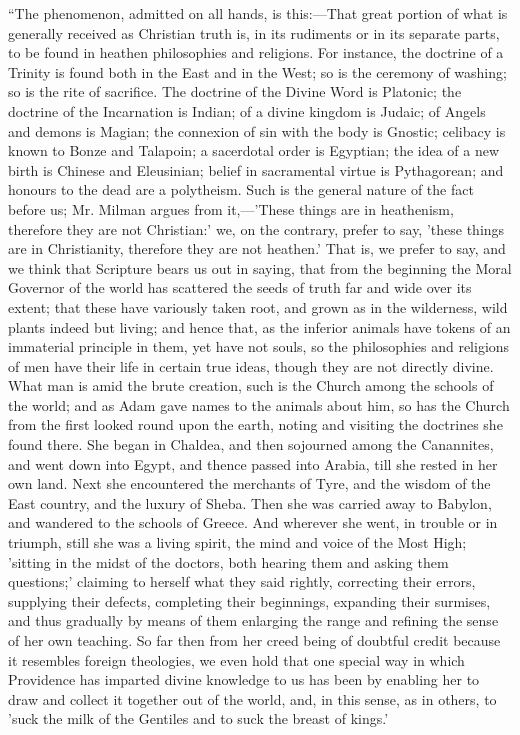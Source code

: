 ``The phenomenon, admitted on all hands, is
this:—That great portion of what is generally
received as Christian truth is, in its rudiments or in
its separate parts, to be found in heathen philosophies
and religions. For instance, the doctrine of a Trinity is
found both in the East and in the West; so is the
ceremony of washing; so is the rite of sacrifice. The
doctrine of the Divine Word is Platonic; the doctrine of
the Incarnation is Indian; of a divine kingdom is Judaic;
of Angels and demons is Magian; the connexion of sin with
the body is Gnostic; celibacy is known to Bonze and
Talapoin; a sacerdotal order is Egyptian; the idea of a
new birth is Chinese and Eleusinian; belief in
sacramental virtue is Pythagorean; and honours to the
dead are a polytheism. Such is the general nature of the
fact before us; Mr. Milman argues from it,—'These
things are in heathenism, therefore they are not
Christian:' we, on the contrary, prefer to say, 'these
things are in Christianity, therefore they are not
heathen.' That is, we prefer to say, and we think that
Scripture bears us out in saying, that from the beginning
the Moral Governor of the world has scattered the seeds
of truth far and wide over its extent; that these have
variously taken root, and grown as in the wilderness,
wild plants indeed but living; and hence that, as the
inferior animals have tokens of an immaterial principle in them, yet have not souls, so the
philosophies and religions of men have their life in
certain true ideas, though they are not directly divine.
What man is amid the brute creation, such is the Church
among the schools of the world; and as Adam gave names to
the animals about him, so has the Church from the first
looked round upon the earth, noting and visiting the
doctrines she found there. She began in Chaldea, and then
sojourned among the Canannites, and went down into Egypt,
and thence passed into Arabia, till she rested in her own
land. Next she encountered the merchants of Tyre, and the
wisdom of the East country, and the luxury of Sheba. Then
she was carried away to Babylon, and wandered to the
schools of Greece. And wherever she went, in trouble or
in triumph, still she was a living spirit, the mind and
voice of the Most High; 'sitting in the midst of the
doctors, both hearing them and asking them questions;'
claiming to herself what they said rightly, correcting
their errors, supplying their defects, completing their
beginnings, expanding their surmises, and thus gradually
by means of them enlarging the range and refining the
sense of her own teaching. So far then from her creed
being of doubtful credit because it resembles foreign
theologies, we even hold that one special way in which
Providence has imparted divine knowledge to us has been
by enabling her to draw and collect it together out of
the world, and, in this sense, as in others, to 'suck the
milk of the Gentiles and to suck the breast of kings.'

